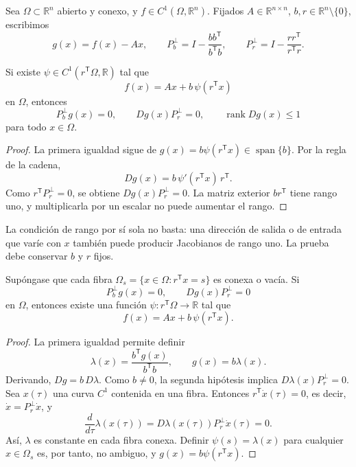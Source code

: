 Sea \(\Omega\subset\mathbb R^n\) abierto y conexo, y
\(f\in C^1(\Omega,\mathbb R^n)\). Fijados \(A\in\mathbb R^{n\times n}\),
\(b,r\in\mathbb R^n\setminus\{0\}\), escribimos
\begin{equation}
 g(x)=f(x)-Ax,\qquad
 P_b^\perp=I-\frac{bb^{\mathsf T}}{b^{\mathsf T}b},\qquad
 P_r^\perp=I-\frac{rr^{\mathsf T}}{r^{\mathsf T}r}.
 \label{eq:th-projectors}
\end{equation}

\begin{proposition}[necesidad]
\label{prop:rank-one-necessary}
Si existe \(\psi\in C^1(r^{\mathsf T}\Omega,\mathbb R)\) tal que
\[
 f(x)=Ax+b\,\psi(r^{\mathsf T}x)
\]
en \(\Omega\), entonces
\begin{equation}
 P_b^\perp g(x)=0,\qquad
 Dg(x)P_r^\perp=0,\qquad
 \operatorname{rank}Dg(x)\leq1
 \label{eq:th-rank-necessary}
\end{equation}
para todo \(x\in\Omega\).
\end{proposition}

\begin{proof}
La primera igualdad sigue de
\(g(x)=b\psi(r^{\mathsf T}x)\in\operatorname{span}\{b\}\). Por la regla de la
cadena,
\[
 Dg(x)=b\,\psi'(r^{\mathsf T}x)\,r^{\mathsf T}.
\]
Como \(r^{\mathsf T}P_r^\perp=0\), se obtiene
\(Dg(x)P_r^\perp=0\). La matriz exterior \(br^{\mathsf T}\) tiene rango uno,
y multiplicarla por un escalar no puede aumentar el rango.
\end{proof}

La condición de rango por sí sola no basta: una dirección de salida o de
entrada que varíe con \(x\) también puede producir Jacobianos de rango uno. La
prueba debe conservar \(b\) y \(r\) fijos.

\begin{proposition}
\label{prop:rank-one-sufficient}
Supóngase que cada fibra
\(\Omega_s=\{x\in\Omega:r^{\mathsf T}x=s\}\) es conexa o vacía. Si
\[
 P_b^\perp g(x)=0,\qquad Dg(x)P_r^\perp=0
\]
en \(\Omega\), entonces existe una función
\(\psi:r^{\mathsf T}\Omega\to\mathbb R\) tal que
\[
 f(x)=Ax+b\,\psi(r^{\mathsf T}x).
\]
\end{proposition}

\begin{proof}
La primera igualdad permite definir
\[
 \lambda(x)=\frac{b^{\mathsf T}g(x)}{b^{\mathsf T}b},
 \qquad g(x)=b\lambda(x).
\]
Derivando, \(Dg=b\,D\lambda\). Como \(b\neq0\), la segunda hipótesis implica
\(D\lambda(x)P_r^\perp=0\). Sea \(x(\tau)\) una curva \(C^1\) contenida en una
fibra. Entonces \(r^{\mathsf T}\dot x(\tau)=0\), es decir,
\(\dot x=P_r^\perp\dot x\), y
\[
 \frac{d}{d\tau}\lambda(x(\tau))
 =D\lambda(x(\tau))P_r^\perp\dot x(\tau)=0.
\]
Así, \(\lambda\) es constante en cada fibra conexa. Definir
\(\psi(s)=\lambda(x)\) para cualquier \(x\in\Omega_s\) es, por tanto, no
ambiguo, y \(g(x)=b\psi(r^{\mathsf T}x)\).
\end{proof}

